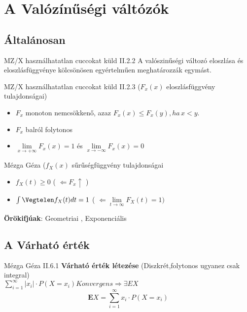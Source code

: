 \section{A Valózínűségi váltózók}
\subsection{Általánosan}
\begin{tetel}{MZ/X használhatatlan cuccokat küld}
II.2.2 A valószinűségi változó eloszlása és eloszlásfüggvénye kölcsönösen egyértelműen meghatározzák egymást. \\[8pt]
\end{tetel}

\begin{tetel}{MZ/X használhatatlan cuccokat küld}
	II.2.3 ($F_x(x)$ eloszlásfüggvény tulajdonságai)
	\begin{itemize}
		\item $F_x$ monoton nemcsökkenő, azaz $F_x(x) \leq F_x(y), ha\, x < y.$
		\item $F_x$ balról folytonos
		\item $\lim\limits_{x \to +\infty} F_x(x) = 1$ és $\lim\limits_{x \to -\infty} F_x(x) = 0$
	\end{itemize}
\end{tetel}

	\begin{definicio}{Mézga Géza}
   ($f_X(x)$ sűrűségfüggvény tulajdonságai
	\begin{itemize}
		\item $f_X(t) \geq 0$ \qquad ( $\Leftarrow F_x \uparrow$ )
		\item $\int\Vegtelen f_X(t) dt = 1 $ \qquad ( $ \Leftarrow \lim\limits_{t  \to \infty} F_X(t) = 1 )$
	\end{itemize}
\end{definicio}

	\textbf{Örökifjúak}: Geometriai , Exponenciális

\subsection{A Várható érték}
	\begin{definicio}{Mézga Géza}
  II.6.1 \textbf{Várható érték létezése} (Diszkrét,\small folytonos ugyanez csak integral) \\[3pt]\normalsize
		$\sum\limits_{i=1}^\infty |x_i| \cdot P(X = x_i) Konvergens \Longrightarrow \exists EX$
		$$ \textbf{E}X = \sum_{i=1}^\infty x_i \cdot P(X = x_i)$$

\end{definicio}

